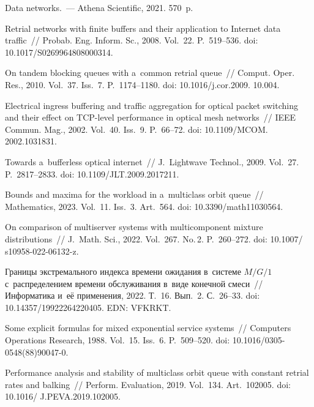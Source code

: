 \begin{multicols}{2}
{{\begin{thebibliography}{99}
{Data networks}.~--- Athena Scientific, 2021.  570~p.

Retrial networks with finite buffers and their application to Internet data 
traffic~//  Probab. Eng. Inform. Sc., 2008. 
Vol.~22. P.~519--536. doi: 10.1017/S0269964808000314.

{On tandem blocking queues with a~common retrial queue}~// Comput.  
Oper. Res., 2010. Vol.~37. Iss.~7. P.~1174--1180. doi: 10.1016/j.cor.2009. 10.004.



{Electrical ingress buffering and traffic aggregation for optical packet 
switching and their effect on TCP-level performance in optical mesh networks}~//
IEEE Commun. Mag., 2002.
Vol.~40. Iss.~9. P.~66--72. doi: 10.1109/MCOM. 2002.1031831.

{Towards a~bufferless optical internet}~//
J.~Lightwave Technol., 2009. Vol.~27. P.~2817--2833. doi: 10.1109/JLT.2009.2017211.

 Bounds and maxima for the 
workload in a~multiclass orbit queue~// Mathematics, 2023. Vol.~11. Iss.~3. 
Art.~564. doi: 10.3390/math11030564.

 On comparison of 
multiserver systems with multicomponent mixture distributions~// J.~Math. Sci., 2022. Vol.~267. No.\,2. P.~260--272.
doi: 10.1007/ s10958-022-06132-z. 

Границы экстремального индекса времени ожидания в~системе
$M/G/1$ с~распределением времени обслуживания в~виде конечной
смеси~// Информатика и~её применения, 2022.
Т.~16. Вып.~2. С.~26--33. doi: 10.14357/19922264220405. EDN: VFKRKT.



Some explicit formulas for mixed exponential service systems~//
Computers Operations Research, 1988. Vol.~15. Iss.~6. P.~509--520. doi: 
{10.1016/0305-0548(88)90047-0}.

Performance analysis and stability of multiclass orbit queue with constant 
retrial rates and balking~//
 Perform. Evaluation, 2019.  Vol.~134. Art.~102005. doi: 
10.1016/ J.PEVA.2019.102005.


\end{thebibliography}}}
\end{multicols}
